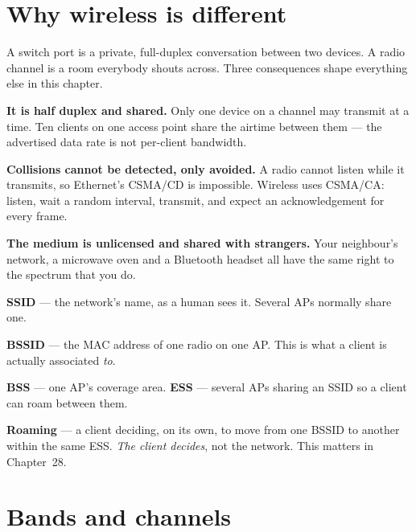 \section{Why wireless is different}

A switch port is a private, full-duplex conversation between two devices. A radio
channel is a room everybody shouts across. Three consequences shape everything
else in this chapter.

\begin{tight}
  \item \textbf{It is half duplex and shared.} Only one device on a channel may
        transmit at a time. Ten clients on one access point share the airtime
        between them --- the advertised data rate is not per-client bandwidth.
  \item \textbf{Collisions cannot be detected, only avoided.} A radio cannot
        listen while it transmits, so Ethernet's CSMA/CD is impossible. Wireless
        uses CSMA/CA: listen, wait a random interval, transmit, and expect an
        acknowledgement for every frame.
  \item \textbf{The medium is unlicensed and shared with strangers.} Your
        neighbour's network, a microwave oven and a Bluetooth headset all have
        the same right to the spectrum that you do.
\end{tight}

\begin{definitionbox}
\begin{tight}
  \item \textbf{SSID} --- the network's name, as a human sees it. Several APs
        normally share one.
  \item \textbf{BSSID} --- the MAC address of one radio on one AP. This is what a
        client is actually associated \emph{to}.
  \item \textbf{BSS} --- one AP's coverage area. \textbf{ESS} --- several APs
        sharing an SSID so a client can roam between them.
  \item \textbf{Roaming} --- a client deciding, on its own, to move from one
        BSSID to another within the same ESS. \emph{The client decides}, not the
        network. This matters in Chapter~28.
\end{tight}
\end{definitionbox}

\section{Bands and channels}

